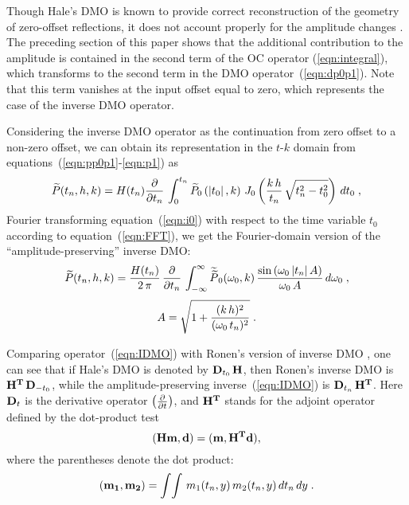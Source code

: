 Though Hale's DMO is known to provide correct reconstruction of the
geometry of zero-offset reflections, it does not account properly for
the amplitude changes \cite[]{GEO58-01-00470066}. The preceding section of this
paper shows that the additional contribution to the amplitude
is contained in the second term of the OC operator
(\ref{eqn:integral}), which transforms to the second term in the DMO
operator~(\ref{eqn:dp0p1}). Note that this term vanishes at the input offset
equal to zero, which represents the case of the inverse DMO operator.

Considering the inverse DMO operator as the continuation from zero
offset to a non-zero offset, we can obtain its representation in the
$t$-$k$ domain from equations~(\ref{eqn:pp0p1}-\ref{eqn:p1}) as
\begin{equation}
\widetilde{P}(t_n,h,k)  = 
H(t_n) {\partial \over {\partial t_n}}\,
\int_{0}^{t_n}
\widetilde{P}_0\left(\left|t_0\right|,k\right)\,
J_0\left({{k\,h}\over t_n}\,
\sqrt{t_n^2-t_0^2}\right)\,dt_0\;,
\label{eqn:i0} 
\end{equation}
Fourier transforming equation~(\ref{eqn:i0}) with respect to the time
variable $t_0$ according to equation~(\ref{eqn:FFT}), we get the
Fourier-domain version of the ``amplitude-preserving'' inverse DMO:
\begin{equation}
\widetilde{P}(t_n,h,k) = 
{H(t_n) \over {2\,\pi}}\,{\partial \over \partial t_n}\,
\int_{-\infty}^{\infty}
\widetilde{\widetilde{P}}_0(\omega_0,k)\, 
{{\sin{\left(\omega_0\,|t_n|\,A\right)} \over {\omega_0\,A}}}
\,d\omega_0\;,
\label{eqn:IDMO} 
\end{equation}
\begin{equation}
A=\sqrt{1+{(k\,h)^2 \over (\omega_0\,t_n)^2}}\;.
\label{eqn:a1} 
\end{equation}

Comparing operator~(\ref{eqn:IDMO}) with Ronen's version of inverse DMO
\cite[]{GEO52-07-09730984}, one can see that if Hale's DMO is denoted
by ${\bf D}_{t_0}\,{\bf H}$, then Ronen's inverse DMO is ${\bf
H^{T}\,D}_{-t_0}$, while the amplitude-preserving inverse~(\ref{eqn:IDMO})
is ${\bf D}_{t_n}\,{\bf H^T}$. Here ${\bf D}_t$ is the derivative
operator $\left( \partial \over \partial t\right)$, and ${\bf H^T}$
stands for the adjoint operator defined by the dot-product test
\begin{equation}
{\bf (Hm,d)=(m,H^{T}d)},
\label{eqn:dot}
\end{equation}
where the parentheses denote the dot product:
\begin{equation}
{\bf (m_1,m_2)}=\int\!\int\,m_1(t_n,y)\,m_2(t_n,y)\,dt_n\,dy\;.
\nonumber
\end{equation}
  
